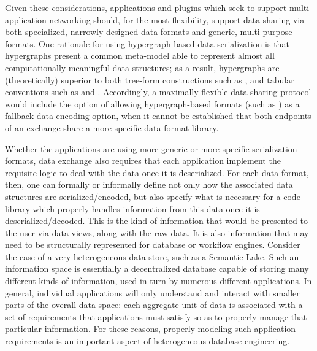 \documentclass[11pt,letterpaper]{article}
\newcommand{\SQL}{\resizebox{!}{7pt}{\AcronymText{SQL}}}
\newcommand{\ATextCClr}[1]{\textcolor{atcColor}{\textbf{#1}}}
\newcommand{\HGXF}{{\resizebox{!}{7.5pt}{\ATextCClr{HGXF}}}}
\newcommand{\XML}{\resizebox{!}{7pt}{\AcronymText{XML}}}
\newcommand{\textscc}[1]{{\color{orr!35!black}{{%
						\fontfamily{Cabin-TLF}\fontseries{b}\selectfont{\textsc{\scriptsize{#1}}}}}}}
\newcommand{\AcronymText}[1]{{\textscc{#1}}}
\newcommand{\CSV}{{\resizebox{!}{7pt}{\AcronymText{CSV}}}}
\newcommand{\p}[1]{

\vspace{1em}#1}
\begin{document}
{\p{Given these considerations, applications and 
plugins which seek to support multi-application 
networking should, for the most flexibility, 
support data sharing via both specialized, 
narrowly-designed data formats and 
generic, multi-purpose formats.  One 
rationale for using hypergraph-based 
data serialization is that hypergraphs 
present a common meta-model able to 
represent almost all computationally 
meaningful data structures; as a result, 
hypergraphs are (theoretically) superior 
to both tree-form constructions such 
as \XML{}, and tabular conventions such 
as \CSV{} and \SQL{}.  Accordingly, 
a maximally flexible data-sharing protocol 
would include the option of allowing 
hypergraph-based formats (such as \HGXF{}) 
as a fallback data encoding option, when 
it cannot be established that both 
endpoints of an exchange share a more 
specific data-format library.}

\p{Whether the applications are using 
more generic or more specific serialization 
formats, data exchange also requires 
that each application implement the requisite logic 
to deal with the data once it is 
deserialized.  For each data format, 
then, one can formally or informally 
define not only how the associated 
data structures are serialized/encoded, 
but also specify what is necessary for a 
code library which properly handles 
information from this data once it is 
deserialized/decoded.  This is the kind 
of information that would be presented 
to the user via \MSDX{} data views, along with 
the raw data.  It is also information that 
may need to be structurally represented 
for database or workflow engines.  Consider 
the case of a very heterogeneous data store, 
such as a Semantic Lake.  Such an 
information space is essentially a decentralized 
database capable of storing many different kinds 
of information, used in turn by numerous 
different applications.  In general, 
individual applications will only understand 
and interact with smaller parts of the 
overall data space: each aggregate unit of 
data is associated with a set of requirements 
that applications must satisfy so as 
to properly manage that particular information.  
For these reasons, properly modeling such 
application requirements is an important 
aspect of heterogeneous database engineering.}

}
\end{document}
